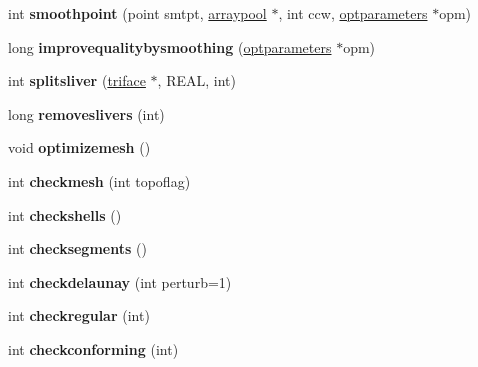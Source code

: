 \begin{DoxyCompactItemize}
\mbox{\label{classtetgenmesh_a8edf1b91719a1e64acd4fe8617184905}} 
int {\bfseries smoothpoint} (point smtpt, \hyperlink{classtetgenmesh_1_1arraypool}{arraypool} $\ast$, int ccw, \hyperlink{classtetgenmesh_1_1optparameters}{optparameters} $\ast$opm)
\item 
\mbox{\label{classtetgenmesh_a1d652618e67ac4ff3057373e15016181}} 
long {\bfseries improvequalitybysmoothing} (\hyperlink{classtetgenmesh_1_1optparameters}{optparameters} $\ast$opm)
\item 
\mbox{\label{classtetgenmesh_aa9540f310c97db99c989a02b0978ceec}} 
int {\bfseries splitsliver} (\hyperlink{classtetgenmesh_1_1triface}{triface} $\ast$, R\+E\+AL, int)
\item 
\mbox{\label{classtetgenmesh_ad5c46c2f6c9adeed23fc8c64b682778d}} 
long {\bfseries removeslivers} (int)
\item 
\mbox{\label{classtetgenmesh_a8bb5c6ad8ccfa57f2a84e5a78295b263}} 
void {\bfseries optimizemesh} ()
\item 
\mbox{\label{classtetgenmesh_ad651dfc786ffccea226a0bf786f94222}} 
int {\bfseries checkmesh} (int topoflag)
\item 
\mbox{\label{classtetgenmesh_a1db73573a8d3fdfe9da17556b6aacad4}} 
int {\bfseries checkshells} ()
\item 
\mbox{\label{classtetgenmesh_ae2cbec9eb2c18f23e2046780841c9f6a}} 
int {\bfseries checksegments} ()
\item 
\mbox{\label{classtetgenmesh_ac5cf882a4f14757177811f3674aaf4f8}} 
int {\bfseries checkdelaunay} (int perturb=1)
\item 
\mbox{\label{classtetgenmesh_a4acb9c2400d8d496b0e546f59eb0e9a8}} 
int {\bfseries checkregular} (int)
\item 
\mbox{\label{classtetgenmesh_aa7ff4d59b68391bc6eb4998017a43b77}} 
int {\bfseries checkconforming} (int)
\item 

\end{DoxyCompactItemize}

